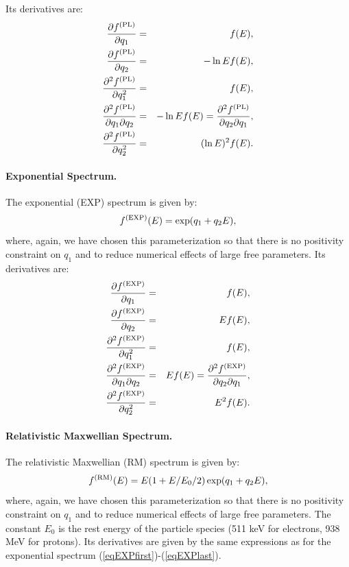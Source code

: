 \documentclass{article}    %
\newcommand{\subsubsubsection}[1]{\paragraph{#1.}}
\begin{document}
Its derivatives are:
\begin{eqnarray}
\frac{\partial f^{\rm (PL)}}{\partial q_1} &=& f(E), \\
\frac{\partial f^{\rm (PL)}}{\partial q_2} &=& -\ln Ef(E), \\
\frac{\partial^2 f^{\rm (PL)}}{\partial q_1^2} &=& f(E), \\
\frac{\partial^2 f^{\rm (PL)}}{\partial q_1\partial q_2} &=& -\ln Ef(E) 
= \frac{\partial^2 f^{\rm (PL)}}{\partial q_2\partial q_1}, \\
\frac{\partial^2 f^{\rm (PL)}}{\partial q_2^2} &=& (\ln E)^2 f(E).
\end{eqnarray}

\subsubsubsection{Exponential Spectrum}

The exponential (EXP) spectrum is given by:
\begin{equation}
f^{\rm (EXP)}(E) = \exp(q_1 + q_2 E),
\end{equation}
where, again, we have chosen this parameterization so that there is no
positivity constraint on $q_1$ and to reduce numerical effects of
large free parameters.  Its derivatives are:
\begin{eqnarray}
\frac{\partial f^{\rm (EXP)}}{\partial q_1} &=& f(E), \label{eqEXPfirst} \\
\frac{\partial f^{\rm (EXP)}}{\partial q_2} &=& E f(E), \\
\frac{\partial^2 f^{\rm (EXP)}}{\partial q_1^2} &=& f(E), \\
\frac{\partial^2 f^{\rm (EXP)}}{\partial q_1\partial q_2} &=& E f(E) 
= \frac{\partial^2 f^{\rm (EXP)}}{\partial q_2\partial q_1}, \\
\frac{\partial^2 f^{\rm (EXP)}}{\partial q_2^2} &=& E^2 f(E). \label{eqEXPlast}
\end{eqnarray}

\subsubsubsection{Relativistic Maxwellian Spectrum}

The relativistic Maxwellian (RM) spectrum is given by:
\begin{equation}
f^{\rm (RM)}(E) = E(1+E/E_0/2)\exp(q_1 + q_2 E),
\end{equation}
where, again, we have chosen this parameterization so that there is no
positivity constraint on $q_1$ and to reduce numerical effects of
large free parameters. The constant $E_0$ is the rest energy of the
particle species (511 keV for electrons, 938 MeV for protons).  Its
derivatives are given by the same expressions as for the exponential
spectrum (\ref{eqEXPfirst})-(\ref{eqEXPlast}).
\end{document}
